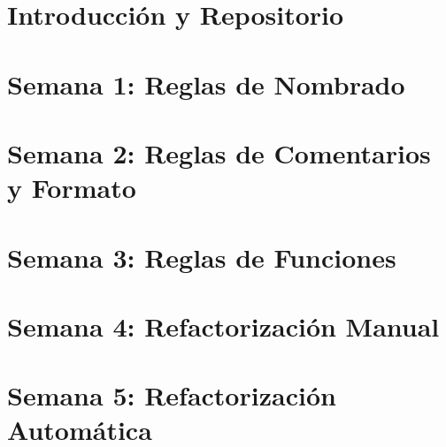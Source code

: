 \documentclass[12pt,a4paper]{article}
\begin{document}


\tableofcontents
\newpage

\section{Introducción y Repositorio}


\section{Semana 1: Reglas de Nombrado}


\section{Semana 2: Reglas de Comentarios y Formato}


\section{Semana 3: Reglas de Funciones}


\section{Semana 4: Refactorización Manual}


\section{Semana 5: Refactorización Automática}

\end{document}
